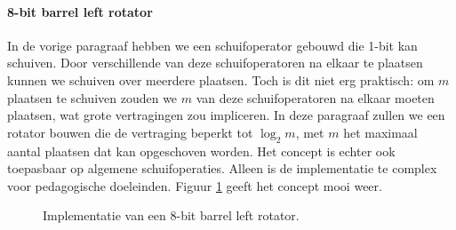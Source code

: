 \paragraph{8-bit barrel left rotator}
In de vorige paragraaf hebben we een schuifoperator gebouwd die 1-bit kan schuiven. Door verschillende van deze schuifoperatoren na elkaar te plaatsen kunnen we schuiven over meerdere plaatsen. Toch is dit niet erg praktisch: om $m$ plaatsen te schuiven zouden we $m$ van deze schuifoperatoren na elkaar moeten plaatsen, wat grote vertragingen zou impliceren. In deze paragraaf zullen we een rotator bouwen die de vertraging beperkt tot $\log_2 m$, met $m$ het maximaal aantal plaatsen dat kan opgeschoven worden. Het concept is echter ook toepasbaar op algemene schuifoperaties. Alleen is de implementatie te complex voor pedagogische doeleinden. Figuur \ref{fig:hBitBarrelLeftRotatorImplementation} geeft het concept mooi weer.
\begin{figure}[hbt]
\centering
{}
\caption{Implementatie van een 8-bit barrel left rotator.}
\label{fig:hBitBarrelLeftRotatorImplementation}
\end{figure}

